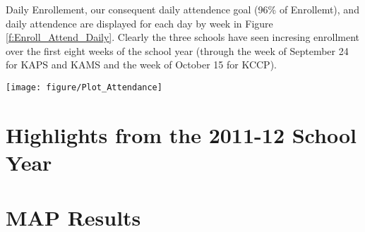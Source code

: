 \documentclass[sfsidenotes, justified]{tufte-handout}\usepackage{graphicx, color}
\newenvironment{knitrout}{}{} %
\begin{document}
Daily Enrollement, our consequent daily attendence goal (96\% of Enrollemt), and daily attendence are displayed for each day by week in Figure \ref{f:Enroll_Attend_Daily}.  Clearly the three schools have seen incresing enrollment over the first eight weeks of the school year (through the week of September 24 for KAPS and KAMS and the week of October 15 for KCCP).  

\begin{figure*}[b!]
\begin{knitrout}
\color{fgcolor}

{\centering \texttt{[image: figure/Plot\_Attendance]} 

}


\end{knitrout}

\end{figure*}\label{f:Enroll_Attend_Daily}

\section{Highlights from the 2011-12 School Year}
\blindtext
\blindtext
\section{MAP Results}
\blindtext
\blindtext
\end{document}
